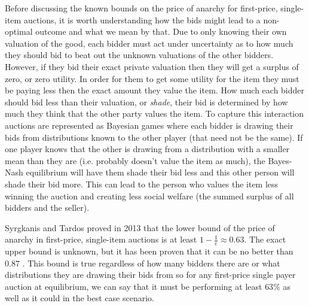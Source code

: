 \documentclass[12pt,twoside]{reedthesis}
\begin{document}
Before discussing the known bounds on the price of anarchy for first-price, single-item auctions, it is worth understanding how the bids might lead to a non-optimal outcome and what we mean by that. Due to only knowing their own valuation of the good, each bidder must act under uncertainty as to how much they should bid to beat out the unknown valuations of the other bidders. However, if they bid their exact private valuation then they will get a surplus of zero, or zero utility. In order for them to get some utility for the item they must be paying less then the exact amount they value the item. How much each bidder should bid less than their valuation, or {\em shade}, their bid is determined by how much they think that the other party values the item. To capture this interaction auctions are represented as Bayesian games where each bidder is drawing their bids from distributions known to the other player (that need not be the same). If one player knows that the other is drawing from a distribution with a smaller mean than they are (i.e. probably doesn't value the item as much), the Bayes-Nash equilibrium will have them shade their bid less and this other person will shade their bid more. This can lead to the person who values the item less winning the auction and creating less social welfare (the summed surplus of all bidders and the seller). 

Syrgkanis and Tardos proved in 2013 that the lower bound of the price of anarchy in first-price, single-item auctions is at least $1 - \frac{1}{e} \approx 0.63$. The exact upper bound is unknown, but it has been proven that it can be no better than $0.87$ \citep{Hartline2015}. This bound is true regardless of how many bidders there are or what distributions they are drawing their bids from so for any first-price single payer auction at equilibrium, we can say that it must be performing at least $63\%$ as well as it could in the best case scenario. 
\end{document}
